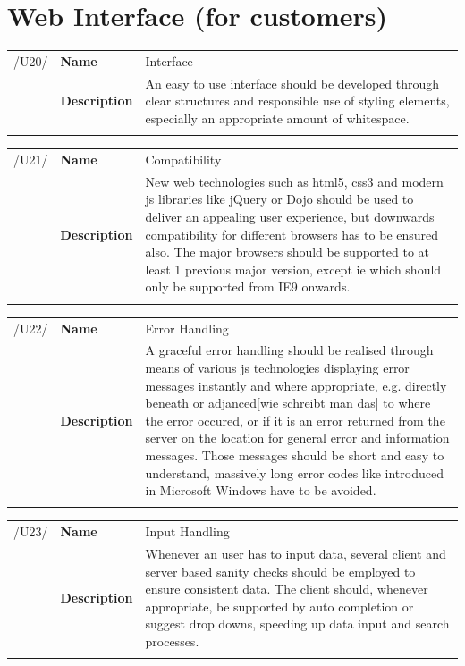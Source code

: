 \documentclass[11pt,a4paper,oneside,svgnames]{report}
\begin{document}
\section{Web Interface (for customers)}
\noindent
\begin{tabular}{llp{8cm}}
\cellcolor{white}/U20/	& \textbf{Name}			& Interface\\
\cellcolor{white}		& \textbf{Description}	& An easy to use interface should be developed through clear structures and responsible use of styling elements, especially an appropriate amount of whitespace.\\
\cellcolor{white}		\hfill \\
\end{tabular}

\noindent
\begin{tabular}{llp{8cm}}
\cellcolor{white}/U21/	& \textbf{Name}			& Compatibility\\
\cellcolor{white}		& \textbf{Description}	& New web technologies such as \acrshort{html}5, \acrshort{css}3 and modern \gls{js} libraries like jQuery or Dojo should be used to deliver an appealing user experience, but downwards compatibility for different browsers has to be ensured also. The major browsers should be supported to at least 1 previous major version, except \gls{ie} which should only be supported from IE9 onwards.\\
\cellcolor{white}		\hfill \\
\end{tabular}

\noindent
\begin{tabular}{llp{8cm}}
\cellcolor{white}/U22/	& \textbf{Name}			& Error Handling\\
\cellcolor{white}		& \textbf{Description}	& A graceful error handling should be realised through means of various \gls{js} technologies displaying error messages instantly and where appropriate, e.g. directly beneath or adjanced[wie schreibt man das] to where the error occured, or if it is an error returned from the server on the location for general error and information messages. Those messages should be short and easy to understand, massively long error codes like introduced in Microsoft Windows have to be avoided.\\
\cellcolor{white}		\hfill \\
\end{tabular}

\noindent
\begin{tabular}{llp{8cm}}
\cellcolor{white}/U23/	& \textbf{Name}			& Input Handling\\
\cellcolor{white}		& \textbf{Description}	& Whenever an user has to input data, several client and server based sanity checks should be employed to ensure consistent data. The client should, whenever appropriate, be supported by auto completion or suggest drop downs, speeding up data input and search processes.\\
\cellcolor{white}		\hfill \\
\end{tabular}
\end{document}
